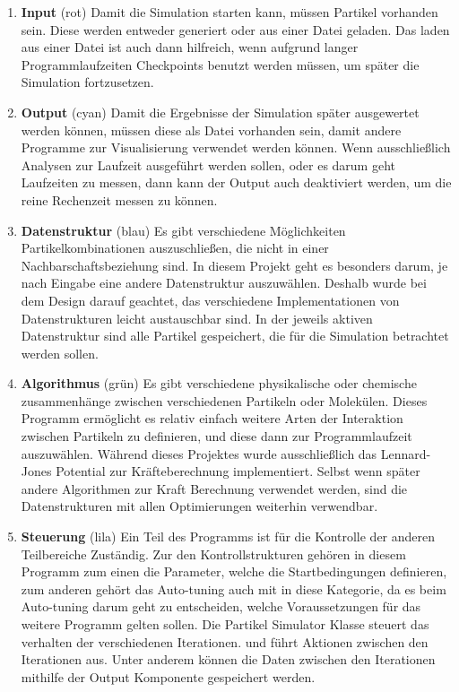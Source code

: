 \documentclass[
	12pt,
	a4paper,
	BCOR10mm,
	DIV14,
	headsepline,
]{scrreprt}
\begin{document}
	\begin{enumerate}
		\item \textbf{Input} (rot) Damit die Simulation starten kann, müssen Partikel vorhanden sein. Diese werden entweder generiert oder aus einer Datei geladen. Das laden aus einer Datei ist auch dann hilfreich, wenn aufgrund langer Programmlaufzeiten Checkpoints benutzt werden müssen, um später die Simulation fortzusetzen.
		\item \textbf{Output} (cyan) Damit die Ergebnisse der Simulation später ausgewertet werden können, müssen diese als Datei vorhanden sein, damit andere Programme zur Visualisierung verwendet werden können. Wenn ausschließlich Analysen zur Laufzeit ausgeführt werden sollen, oder es darum geht Laufzeiten zu messen, dann kann der Output auch deaktiviert werden, um die reine Rechenzeit messen zu können.
		\item \textbf{Datenstruktur} (blau) Es gibt verschiedene Möglichkeiten Partikelkombinationen auszuschließen, die nicht in einer Nachbarschaftsbeziehung sind. In diesem Projekt geht es besonders darum, je nach Eingabe eine andere Datenstruktur auszuwählen. Deshalb wurde bei dem Design darauf geachtet, das verschiedene Implementationen von Datenstrukturen leicht austauschbar sind. In der jeweils aktiven Datenstruktur sind alle Partikel gespeichert, die für die Simulation betrachtet werden sollen.
		\item \textbf{Algorithmus} (grün) Es gibt verschiedene physikalische oder chemische zusammenhänge zwischen verschiedenen Partikeln oder Molekülen. Dieses Programm ermöglicht es relativ einfach weitere Arten der Interaktion zwischen Partikeln zu definieren, und diese dann zur Programmlaufzeit auszuwählen. Während dieses Projektes wurde ausschließlich das Lennard-Jones Potential zur Kräfteberechnung implementiert. Selbst wenn später andere Algorithmen zur Kraft Berechnung verwendet werden, sind die Datenstrukturen mit allen Optimierungen weiterhin verwendbar.
		\item \textbf{Steuerung} (lila) Ein Teil des Programms ist für die Kontrolle der anderen Teilbereiche Zuständig. Zur den Kontrollstrukturen gehören in diesem Programm zum einen die Parameter, welche die Startbedingungen definieren, zum anderen gehört das Auto-tuning auch mit in diese Kategorie, da es beim Auto-tuning darum geht zu entscheiden, welche Voraussetzungen für das weitere Programm gelten sollen. Die Partikel Simulator Klasse steuert das verhalten der verschiedenen Iterationen. und führt Aktionen zwischen den Iterationen aus. Unter anderem können die Daten zwischen den Iterationen mithilfe der Output Komponente gespeichert werden.
	\end{enumerate}
\end{document}
